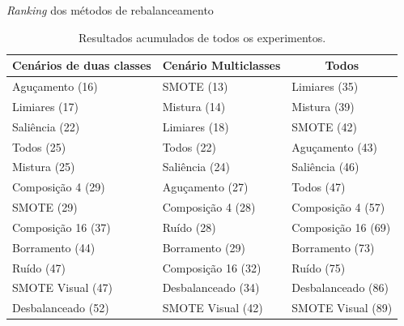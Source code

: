 \documentclass{beamer}
\begin{document}
\begin{frame}{\textit{Ranking} dos métodos de rebalanceamento}
  \setlength\leftmargini{1em}
  \begin{table}
    \centering
    \caption{Resultados acumulados de todos os experimentos.}
    \tiny{
    \begin{tabular}{|l|l|l|}
      \hline
      \multicolumn{1}{|c|}{\textbf{Cenários de duas classes}} & \multicolumn{1}{c|}{\textbf{Cenário Multiclasses}} & \multicolumn{1}{c|}{\textbf{Todos}} \\ \hline
      Aguçamento (16)       & SMOTE (13)          & Limiares (35)                       \\ \hline
      Limiares (17)         & Mistura (14)        & Mistura (39)                        \\ \hline
      Saliência (22)        & Limiares (18)       & SMOTE (42)                          \\ \hline
      Todos (25)            & Todos (22)          & Aguçamento (43)                     \\ \hline
      Mistura (25)          & Saliência (24)      & Saliência (46)                      \\ \hline
      Composição 4 (29)     & Aguçamento (27)     & Todos (47)                          \\ \hline
      SMOTE (29)            & Composição 4 (28)   & Composição 4 (57)                   \\ \hline
      Composição 16 (37)    & Ruído (28)          & Composição 16 (69)                  \\ \hline
      Borramento (44)       & Borramento (29)     & Borramento (73)                     \\ \hline
      Ruído (47)            & Composição 16 (32)  & Ruído (75)                          \\ \hline
      SMOTE Visual (47)     & Desbalanceado (34)  & Desbalanceado (86)                  \\ \hline
      Desbalanceado (52)    & SMOTE Visual (42)   & SMOTE Visual (89)                   \\ \hline
    \end{tabular}
    }
  \end{table}
\end{frame}
\end{document}
